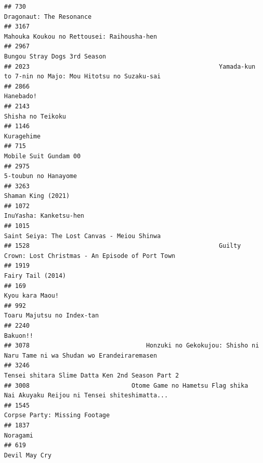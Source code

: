 \documentclass[
]{article}
\begin{document}
\begin{verbatim}
## 730                                                                                   Dragonaut: The Resonance
## 3167                                                                Mahouka Koukou no Rettousei: Raihousha-hen
## 2967                                                                              Bungou Stray Dogs 3rd Season
## 2023                                                    Yamada-kun to 7-nin no Majo: Mou Hitotsu no Suzaku-sai
## 2866                                                                                                 Hanebado!
## 2143                                                                                         Shisha no Teikoku
## 1146                                                                                                Kuragehime
## 715                                                                                      Mobile Suit Gundam 00
## 2975                                                                                      5-toubun no Hanayome
## 3263                                                                                        Shaman King (2021)
## 1072                                                                                    InuYasha: Kanketsu-hen
## 1015                                                               Saint Seiya: The Lost Canvas - Meiou Shinwa
## 1528                                                    Guilty Crown: Lost Christmas - An Episode of Port Town
## 1919                                                                                         Fairy Tail (2014)
## 169                                                                                            Kyou kara Maou!
## 992                                                                                 Toaru Majutsu no Index-tan
## 2240                                                                                                  Bakuon!!
## 3078                                Honzuki no Gekokujou: Shisho ni Naru Tame ni wa Shudan wo Erandeiraremasen
## 3246                                                          Tensei shitara Slime Datta Ken 2nd Season Part 2
## 3008                            Otome Game no Hametsu Flag shika Nai Akuyaku Reijou ni Tensei shiteshimatta...
## 1545                                                                             Corpse Party: Missing Footage
## 1837                                                                                                  Noragami
## 619                                                                                              Devil May Cry

\end{verbatim}
\end{document}
